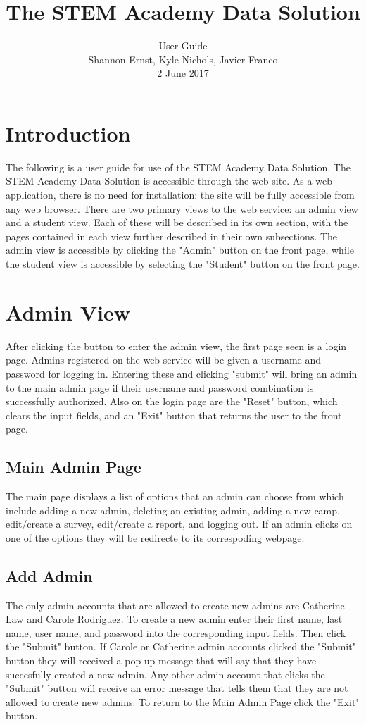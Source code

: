 \documentclass[letterpaper,10pt,serif, draftclsnofoot,onecolumn, compsoc, titlepage]{IEEEtran}
\title{The STEM Academy Data Solution}
\author{User Guide \\ Shannon Ernst, Kyle Nichols, Javier Franco\\ 2 June 2017}
\begin{document}
\maketitle

\newpage
\tableofcontents
\newpage

\section{Introduction}
The following is a user guide for use of the STEM Academy Data Solution.
The STEM Academy Data Solution is accessible through the web site. %
As a web application, there is no need for installation: the site will be fully accessible from any web browser. 
There are two primary views to the web service: an admin view and a student view.
Each of these will be described in its own section, with the pages contained in each view further described in their own subsections.
The admin view is accessible by clicking the "Admin" button on the front page, while the student view is
 accessible by selecting the "Student" button on the front page.

\section{Admin View}
After clicking the button to enter the admin view, the first page seen is a login page.
Admins registered on the web service will be given a username and password for logging in.
Entering these and clicking "submit" will bring an admin to the main admin page if their username
 and password combination is successfully authorized. Also on the login page are the "Reset" button,
 which clears the input fields, and an "Exit" button that returns the user to the front page.
\subsection{Main Admin Page}
The main page displays a list of options that an admin can choose from which include adding a new admin, deleting an existing admin, adding a new camp, edit/create a survey, edit/create a report, and logging out. If an admin clicks on one of the options they will be redirecte to its correspoding webpage. 
\subsection{Add Admin}
The only admin accounts that are allowed to create new admins are Catherine Law and Carole Rodriguez. To create a new admin enter their first name, last name, user name, and password into the corresponding input fields. Then click the "Submit" button. If Carole or Catherine admin accounts clicked the "Submit" button they will received a pop up message that will say that they have succesfully created a new admin. Any other admin account that clicks the "Submit" button will receive an error message that tells them that they are not allowed to create new admins. To return to the Main Admin Page click the "Exit" button. 
\end{document}

